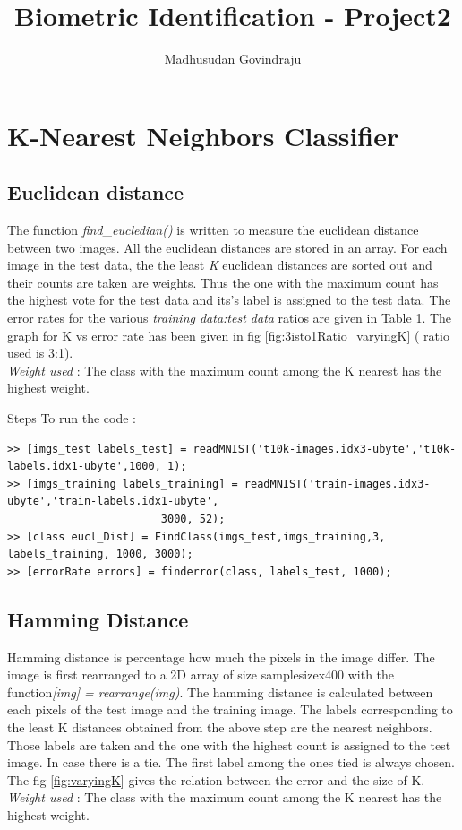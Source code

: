 \documentclass[10pt, letterpaper]{article}
\author{Madhusudan Govindraju}
\date{}
\begin{document}
\title{Biometric Identification - Project2}
\maketitle

\section{K-Nearest Neighbors Classifier } 

\vspace{10mm}

\subsection{Euclidean distance}

The function {\sl find}\_{\sl eucledian()} is written to measure the euclidean distance between two images. All the euclidean distances are stored in an array. For each image in the test data, the the least {\sl K} euclidean distances are sorted out and their counts are taken are weights. Thus the one with the maximum count has the highest vote for the test data and its's label is assigned to the test data. The error rates for the various {\sl training data:test data} ratios are given in Table 1. The graph for K vs error rate has been given in 
fig \ref{fig:3isto1Ratio_varyingK} ( ratio used is 3:1). \\{\sl Weight used} : The class with the maximum count among the K nearest has the highest weight.
   
 
 Steps To run the code :
\begin{verbatim}
>> [imgs_test labels_test] = readMNIST('t10k-images.idx3-ubyte','t10k-labels.idx1-ubyte',1000, 1);
>> [imgs_training labels_training] = readMNIST('train-images.idx3-ubyte','train-labels.idx1-ubyte',
						3000, 52);
>> [class eucl_Dist] = FindClass(imgs_test,imgs_training,3, labels_training, 1000, 3000);
>> [errorRate errors] = finderror(class, labels_test, 1000);
\end{verbatim}
   
   \vspace{10mm}
   

\subsection{Hamming Distance}
Hamming distance is percentage how much the pixels in the image differ. The image is first rearranged to a 2D array of size samplesizex400 with the function{\sl [img] = rearrange(img)}. The hamming distance is calculated between each pixels of the test image and the training image. The labels corresponding to the least K distances obtained from the above step are the nearest neighbors. Those labels are taken and the one with the highest count is assigned to the test image. In case there is a tie. The first label among the ones tied is always chosen.  The fig \ref{fig:varyingK} gives the relation between the error and the size of K.
\\{\sl Weight used} : The class with the maximum count among the K nearest has the highest weight.
\end{document}
